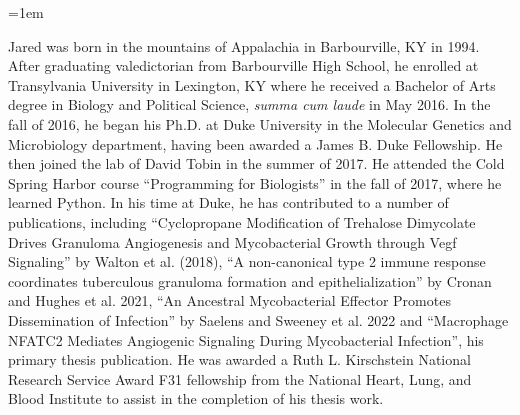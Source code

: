 \documentclass[PhD]{dukethesis2006}
\begin{document}
% 

\emergencystretch=1em
\printbibliography[category=cited, heading=bibintoc]

	
\biography

\begin{doublespace}

Jared was born in the mountains of Appalachia in Barbourville, KY in 1994. After graduating valedictorian from Barbourville High School, he enrolled at Transylvania University in Lexington, KY where he received a Bachelor of Arts degree in Biology and Political Science, \textit{summa cum laude} in May 2016. In the fall of 2016, he began his Ph.D. at Duke University in the Molecular Genetics and Microbiology department, having been awarded a James B. Duke Fellowship. He then joined the lab of David Tobin in the summer of 2017. He attended the Cold Spring Harbor course ``Programming for Biologists'' in the fall of 2017, where he learned Python. In his time at Duke, he has contributed to a number of publications, including ``Cyclopropane Modification of Trehalose Dimycolate Drives Granuloma Angiogenesis and Mycobacterial Growth through Vegf Signaling'' by Walton et al. (2018), ``A non-canonical type 2 immune response coordinates tuberculous granuloma formation and epithelialization'' by Cronan and Hughes et al. 2021, ``An Ancestral Mycobacterial Effector Promotes Dissemination of Infection'' by Saelens and Sweeney et al. 2022 and ``Macrophage NFATC2 Mediates Angiogenic Signaling During Mycobacterial Infection'', his primary thesis publication. He was awarded a Ruth L. Kirschstein National Research Service Award F31 fellowship from the National Heart, Lung, and Blood Institute to assist in the completion of his thesis work.

\end{doublespace}
\end{document}
